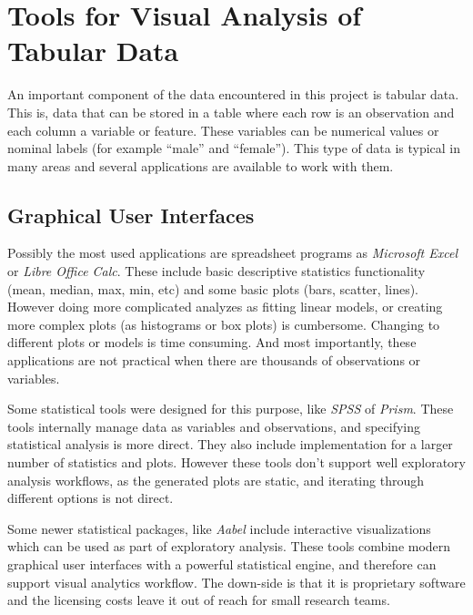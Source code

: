 \section{Tools for Visual Analysis of Tabular Data}

An important component of the data encountered in this project is tabular data. This is, data that can be stored in a table where each row is an observation and each column a variable or feature. These variables can be numerical values or nominal labels (for example ``male'' and ``female''). This type of data is typical in many areas and several applications are available to work with them.

\subsection{Graphical User Interfaces}

Possibly the most used applications are spreadsheet programs as \emph{Microsoft Excel} or \emph{Libre Office Calc}. These  include basic descriptive statistics functionality (mean, median, max, min, etc) and some basic plots (bars, scatter, lines). However doing more complicated analyzes as fitting linear models, or creating more complex plots (as histograms or box plots) is cumbersome. Changing to different plots or models is time consuming. And most importantly, these applications are not practical when there are thousands of observations or variables. 


Some statistical tools were designed for this purpose, like \emph{SPSS} of \emph{Prism}. These tools internally manage data as variables and observations, and specifying statistical analysis is more direct. They also include implementation for a larger number of statistics and plots. However these tools don't support well exploratory analysis workflows, as the generated plots are static, and iterating through different options is not direct.


Some newer statistical packages, like \emph{Aabel} include interactive visualizations which can be used as part of exploratory analysis. These tools combine modern graphical user interfaces with a powerful statistical engine, and therefore can support visual analytics workflow. The down-side is that it is proprietary software and the licensing costs leave it out of reach for small research teams.	


